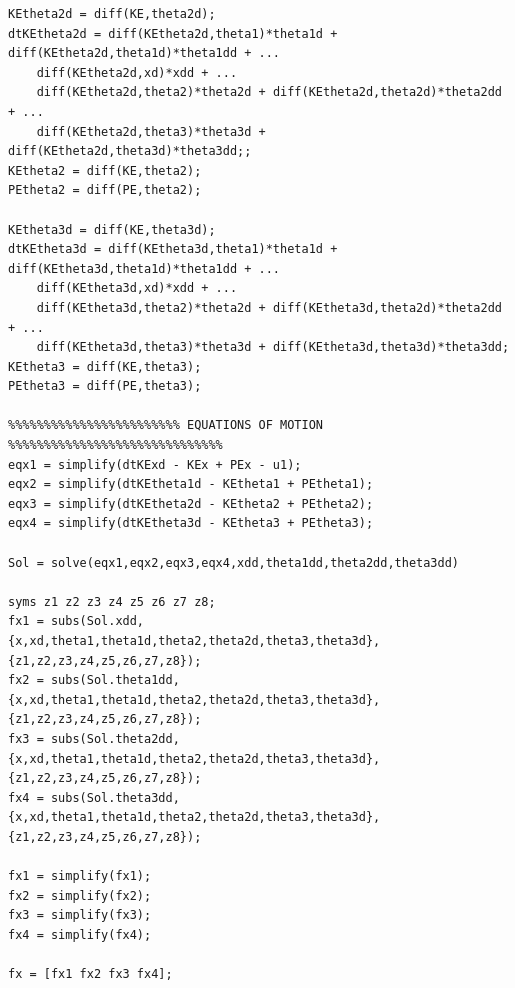 \documentclass[a4paper,12pt]{article}
\begin{document}
\begin{lstlisting}[label=code:mathmodelpendulum,caption=\texttt{math\_model\_pendulum.m}]
KEtheta2d = diff(KE,theta2d);
dtKEtheta2d = diff(KEtheta2d,theta1)*theta1d + diff(KEtheta2d,theta1d)*theta1dd + ...
	diff(KEtheta2d,xd)*xdd + ...
	diff(KEtheta2d,theta2)*theta2d + diff(KEtheta2d,theta2d)*theta2dd + ...
	diff(KEtheta2d,theta3)*theta3d + diff(KEtheta2d,theta3d)*theta3dd;;
KEtheta2 = diff(KE,theta2);
PEtheta2 = diff(PE,theta2);

KEtheta3d = diff(KE,theta3d);
dtKEtheta3d = diff(KEtheta3d,theta1)*theta1d + diff(KEtheta3d,theta1d)*theta1dd + ...
	diff(KEtheta3d,xd)*xdd + ...
	diff(KEtheta3d,theta2)*theta2d + diff(KEtheta3d,theta2d)*theta2dd + ...
	diff(KEtheta3d,theta3)*theta3d + diff(KEtheta3d,theta3d)*theta3dd;
KEtheta3 = diff(KE,theta3);
PEtheta3 = diff(PE,theta3);

%%%%%%%%%%%%%%%%%%%%%%%% EQUATIONS OF MOTION %%%%%%%%%%%%%%%%%%%%%%%%%%%%%%
eqx1 = simplify(dtKExd - KEx + PEx - u1);
eqx2 = simplify(dtKEtheta1d - KEtheta1 + PEtheta1);
eqx3 = simplify(dtKEtheta2d - KEtheta2 + PEtheta2);
eqx4 = simplify(dtKEtheta3d - KEtheta3 + PEtheta3);

Sol = solve(eqx1,eqx2,eqx3,eqx4,xdd,theta1dd,theta2dd,theta3dd)

syms z1 z2 z3 z4 z5 z6 z7 z8;
fx1 = subs(Sol.xdd, {x,xd,theta1,theta1d,theta2,theta2d,theta3,theta3d}, {z1,z2,z3,z4,z5,z6,z7,z8});
fx2 = subs(Sol.theta1dd, {x,xd,theta1,theta1d,theta2,theta2d,theta3,theta3d}, {z1,z2,z3,z4,z5,z6,z7,z8});
fx3 = subs(Sol.theta2dd, {x,xd,theta1,theta1d,theta2,theta2d,theta3,theta3d}, {z1,z2,z3,z4,z5,z6,z7,z8});
fx4 = subs(Sol.theta3dd, {x,xd,theta1,theta1d,theta2,theta2d,theta3,theta3d}, {z1,z2,z3,z4,z5,z6,z7,z8});

fx1 = simplify(fx1);
fx2 = simplify(fx2);
fx3 = simplify(fx3);
fx4 = simplify(fx4);

fx = [fx1 fx2 fx3 fx4];
\end{lstlisting}
\end{document}
